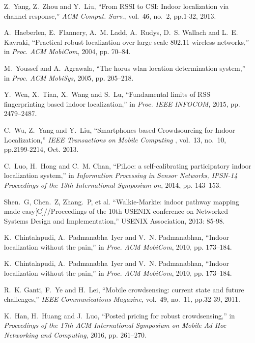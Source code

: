 \documentclass[10pt,conference,compsocconf,letterpaper]{IEEEtran}
\begin{document}
\begin{thebibliography}{99}

Z.~Yang, Z.~Zhou and Y.~Liu, ``From RSSI to CSI: Indoor localization via channel response,'' \emph{ACM Comput. Surv.}, vol.~46, no.~2, pp.1-32, 2013.

A.~Haeberlen, E.~Flannery, A.~M. Ladd, A.~Rudys, D.~S. Wallach and L.~E. Kavraki, ``Practical robust localization over large-scale 802.11 wireless networks,'' in \emph{Proc. ACM MobiCom}, 2004, pp. 70--84.

M.~Youssef and A.~Agrawala, ``The horus wlan location determination system,'' in \emph{Proc. ACM MobiSys}, 2005, pp. 205--218.

Y.~Wen, X.~Tian, X.~Wang and S.~Lu, ``Fundamental limits of RSS fingerprinting based indoor localization,'' in \emph{Proc. IEEE INFOCOM}, 2015, pp. 2479--2487.

C.~Wu, Z.~Yang and Y.~Liu, ``Smartphones based Crowdsourcing for Indoor Localization,'' \emph{IEEE Transactions on Mobile Computing }, vol.~13, no.~10, pp.2199-2214, Oct. 2013.

C.~Luo, H.~Hong and C.~M. Chan, ``PiLoc: a self-calibrating participatory indoor localization system,'' in \emph{Information Processing in Sensor Networks, IPSN-14 Proceedings of the 13th International Symposium on}, 2014, pp. 143--153.

Shen.~G, Chen.~Z, Zhang.~P, et al. ``Walkie-Markie: indoor pathway mapping made easy[C]//Proceedings of the 10th USENIX conference on Networked Systems Design and Implementation,'' USENIX Association, 2013: 85-98.

K.~Chintalapudi, A.~Padmanabha~Iyer and V.~N. Padmanabhan, ``Indoor
  localization without the pain,'' in \emph{Proc. ACM MobiCom}, 2010, pp.
  173--184.

K.~Chintalapudi, A.~Padmanabha~Iyer and V.~N. Padmanabhan, ``Indoor
  localization without the pain,'' in \emph{Proc. ACM MobiCom}, 2010, pp. 173--184.

R.~K. Ganti, F.~Ye and H.~Lei, ``Mobile crowdsensing: current state and future challenges,'' \emph{IEEE Communications Magazine}, vol.~49, no.~11, pp.32-39, 2011.

K.~Han, H.~Huang and J.~Luo, ``Posted pricing for robust crowdsensing,'' in \emph{Proceedings of the 17th ACM International Symposium on Mobile Ad Hoc Networking and Computing}, 2016, pp. 261--270.


\end{thebibliography}
\end{document}
